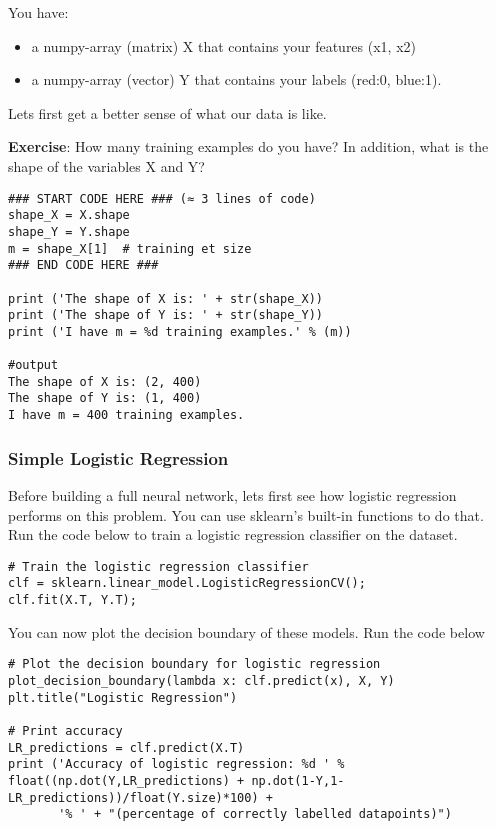 You have:
\begin{itemize}
\item a numpy-array (matrix) X that contains your features (x1, x2)
\item a numpy-array (vector) Y that contains your labels (red:0, blue:1).
\end{itemize}

Lets first get a better sense of what our data is like.

{\textbf{Exercise}}: How many training examples do you have? In addition, what is the shape of the variables X and Y?

\begin{verbatim}
### START CODE HERE ### (≈ 3 lines of code)
shape_X = X.shape
shape_Y = Y.shape
m = shape_X[1]  # training et size
### END CODE HERE ###

print ('The shape of X is: ' + str(shape_X))
print ('The shape of Y is: ' + str(shape_Y))
print ('I have m = %d training examples.' % (m))

#output
The shape of X is: (2, 400)
The shape of Y is: (1, 400)
I have m = 400 training examples.
\end{verbatim}


\subsubsection{Simple Logistic Regression}

Before building a full neural network, lets first see how logistic regression performs on this problem. You can use sklearn's built-in functions to do that. Run the code below to train a logistic regression classifier on the dataset.
\begin{verbatim}
# Train the logistic regression classifier
clf = sklearn.linear_model.LogisticRegressionCV();
clf.fit(X.T, Y.T);
\end{verbatim}

You can now plot the decision boundary of these models. Run the code below
\begin{verbatim}
# Plot the decision boundary for logistic regression
plot_decision_boundary(lambda x: clf.predict(x), X, Y)
plt.title("Logistic Regression")

# Print accuracy
LR_predictions = clf.predict(X.T)
print ('Accuracy of logistic regression: %d ' % float((np.dot(Y,LR_predictions) + np.dot(1-Y,1-LR_predictions))/float(Y.size)*100) +
       '% ' + "(percentage of correctly labelled datapoints)")
\end{verbatim}


